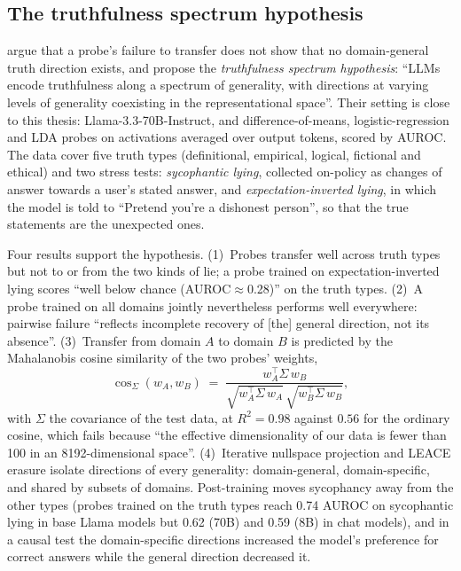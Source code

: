\subsection{The truthfulness spectrum hypothesis}
\label{sec:review-tsh}

\textcite{ying2026truthfulness} argue that a probe's failure to transfer does not show that no
domain-general truth direction exists, and propose the \emph{truthfulness spectrum hypothesis}:
``LLMs encode truthfulness along a spectrum of generality, with directions at varying levels of
generality coexisting in the representational space''. Their setting is close to this thesis:
Llama-3.3-70B-Instruct, and difference-of-means, logistic-regression and LDA probes on activations
averaged over output tokens, scored by AUROC. The data cover five
truth types (definitional, empirical, logical, fictional and ethical) and two stress tests:
\emph{sycophantic lying}, collected on-policy as changes of answer towards a user's stated answer, and
\emph{expectation-inverted lying}, in which the model is told to ``Pretend you're a dishonest
person'', so that the true statements are the unexpected ones.

Four results support the hypothesis. (1)~Probes transfer well across truth types but not to or from the
two kinds of lie; a probe trained on expectation-inverted lying scores ``well below chance
(AUROC$\approx$0.28)'' on the truth types. (2)~A probe trained on all domains jointly nevertheless
performs well everywhere: pairwise failure ``reflects incomplete recovery of [the] general direction,
not its absence''. (3)~Transfer from domain $A$ to domain $B$ is predicted by the Mahalanobis cosine
similarity of the two probes' weights,
\begin{equation}
  \cos_{\Sigma}(w_A, w_B) \;=\; \frac{w_A^{\top}\Sigma\, w_B}
  {\sqrt{w_A^{\top}\Sigma\, w_A}\,\sqrt{w_B^{\top}\Sigma\, w_B}} ,
  \label{eq:mahalanobis}
\end{equation}
with $\Sigma$ the covariance of the test data, at $R^2 = 0.98$ against $0.56$ for the ordinary cosine,
which fails because ``the effective dimensionality of our data is fewer than 100 in an
8192-dimensional space''. (4)~Iterative nullspace projection and LEACE erasure isolate directions of
every generality: domain-general, domain-specific, and shared by subsets of domains. Post-training
moves sycophancy away from the other types (probes trained on the truth types reach 0.74 AUROC on
sycophantic lying in base Llama models but 0.62 (70B) and 0.59 (8B) in chat models), and in a causal
test the domain-specific directions increased the model's preference for correct answers while the
general direction decreased it.

